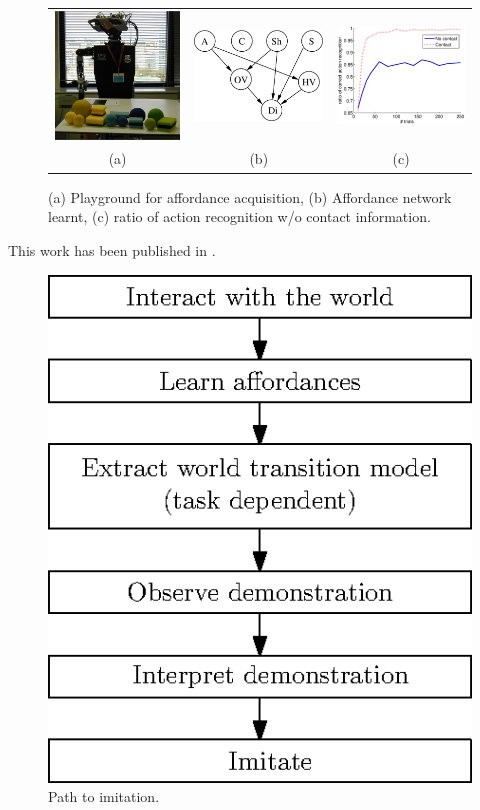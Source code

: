 \begin{figure}
\begin{tabular}{ccc}
\includegraphics[width=0.3\columnwidth]{images/setup.eps} &
\includegraphics[width=0.3\columnwidth]{images/MCMCIROS1_p072.eps} &
\includegraphics[width=0.3\columnwidth]{images/resIROSActionRecog.eps} \\
(a) & (b) & (c) \\
\end{tabular}
\caption{(a) Playground for affordance acquisition, (b) Affordance
  network learnt,  (c) ratio of action recognition w/o contact
  information.}
\label{fig:manipulation:affordances}
\end{figure}

This work has been published in \cite{montesano:etal:2007}.

\begin{figure}
\centering
\includegraphics[width=0.3\columnwidth]{images/Diagram.eps}
\caption{Path to imitation.}
\label{fig:manipulation:path}
\end{figure}

